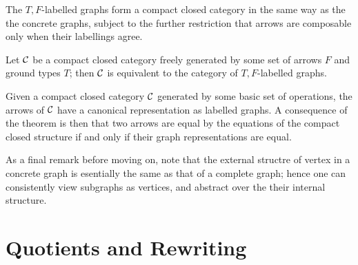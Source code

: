 \documentclass[runningheads]{llncs}
\newcommand{\catC}{\ensuremath{{\cal C}}\xspace}
\begin{document}
The $T,F$-labelled graphs form a compact closed category in the same
way as the the concrete graphs, subject to the further restriction
that arrows are composable only when their labellings agree.  

\begin{theorem}
  Let \catC be a compact closed category  freely generated by some set
  of arrows $F$ and ground types $T$;  then \catC is equivalent to the
  category  of $T,F$-labelled graphs.
\end{theorem}

Given a compact closed  category  \catC generated by some basic set of
operations,  the arrows of \catC have a canonical representation as
labelled graphs.  A consequence of the theorem is then that two arrows
are equal by the equations of the compact closed  structure if and
only if their graph representations are equal.

As a final remark before moving on, note that the external structre of vertex
in a concrete graph is esentially the same as that of a complete
graph;  hence one can consistently view subgraphs as vertices, and
abstract over the their internal structure.

\section{Quotients and Rewriting}
\label{sec:quotients-rewriting}
\end{document}
